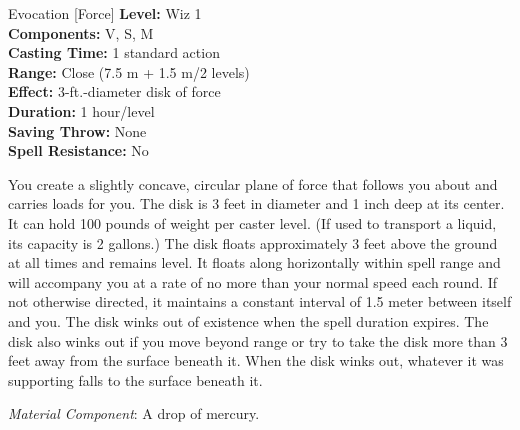 {Evocation [Force]}
{
	\textbf{Level:}
	Wiz 1\\
	\textbf{Components:}
	V, S, M\\
	\textbf{Casting Time:}
	1 standard action\\
	\textbf{Range:}
	Close (7.5 m + 1.5 m/2 levels)\\
	\textbf{Effect:}
	3-ft.-diameter disk of force\\
	\textbf{Duration:}
	1 hour/level\\
	\textbf{Saving Throw:}
	None\\
	\textbf{Spell Resistance:}
	No\\
}
{
	You create a slightly concave, circular plane of force that follows you about and carries loads for you. The disk is 3 feet in diameter and 1 inch deep at its center. It can hold 100 pounds of weight per caster level. (If used to transport a liquid, its capacity is 2 gallons.) The disk floats approximately 3 feet above the ground at all times and remains level. It floats along horizontally within spell range and will accompany you at a rate of no more than your normal speed each round. If not otherwise directed, it maintains a constant interval of 1.5 meter between itself and you. The disk winks out of existence when the spell duration expires. The disk also winks out if you move beyond range or try to take the disk more than 3 feet away from the surface beneath it. When the disk winks out, whatever it was supporting falls to the surface beneath it.

	\textit{Material Component}:
	A drop of mercury.

}
